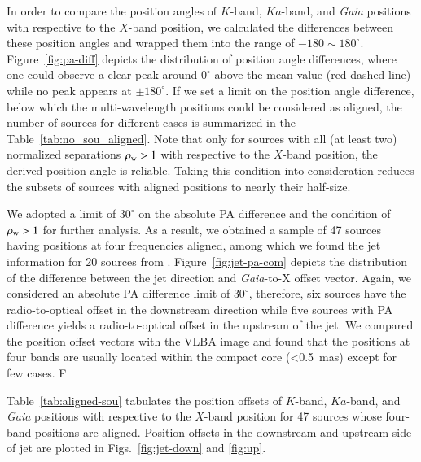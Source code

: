 \documentclass{aa}
\begin{document}
    In order to compare the position angles of $K$-band, $Ka$-band, and \textit{Gaia} positions with respective to the $X$-band position,
    we calculated the differences between these position angles and wrapped them into the range of $-180\sim180^\circ$.
    Figure~\ref{fig:pa-diff} depicts the distribution of position angle differences, where one could observe a clear peak around $0^\circ$ above the mean value (red dashed line) while no peak appears at $\pm 180^\circ$.
    If we set a limit on the position angle difference, below which the multi-wavelength positions could be considered as aligned, the number of sources for different cases is summarized in the Table~\ref{tab:no_sou_aligned}.
    Note that only for sources with all (at least two) normalized separations $\rho_{\rm w}>1$ with respective to the $X$-band position, the derived position angle is reliable.
    Taking this condition into consideration reduces the subsets of sources with aligned positions to nearly their half-size.

    We adopted a limit of $30^\circ$ on the absolute PA difference and the condition of $\rho_{\rm w}>1$ for further analysis.
    As a result, we obtained a sample of 47 sources having positions at  four frequencies aligned, among which we found the jet information for 20 sources from \citep{2019ApJ...874...43L}.
    Figure~\ref{fig:jet-pa-com} depicts the distribution of the difference between the jet direction and \textit{Gaia}-to-X offset vector.
    Again, we considered an absolute PA difference limit of $30^\circ$, therefore, six sources have the radio-to-optical offset in the downstream direction while five sources with PA difference yields a radio-to-optical offset in the upstream of the jet.
    We compared the position offset vectors with the VLBA image and found that the positions at four bands are usually located within the compact core (<0.5~mas) except for few cases.
    F%

    Table~\ref{tab:aligned-sou} tabulates the position offsets of $K$-band, $Ka$-band, and \textit{Gaia} positions with respective to the $X$-band position for 47 sources whose four-band positions are aligned. %
    Position offsets in the downstream and upstream side of jet are plotted in Figs.~\ref{fig:jet-down} and \ref{fig:up}.
\end{document}
